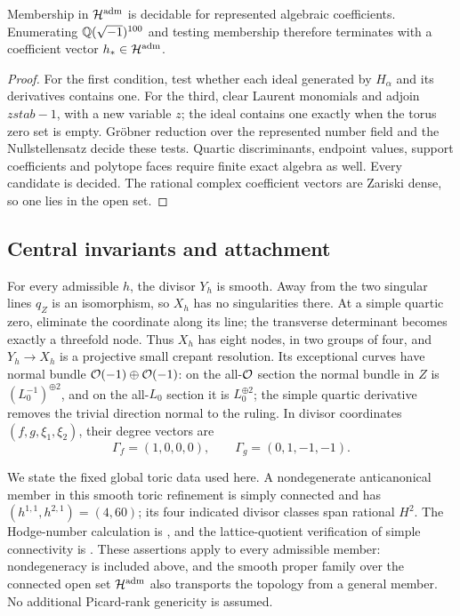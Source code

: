 \begin{proposition}\label{prop:algebraic-choice}
Membership in $\mathcal H^{\rm adm}$ is decidable for represented
algebraic coefficients. Enumerating $\mathbb Q(\sqrt{-1})^{100}$ and
testing membership therefore terminates with a coefficient vector
$h_*\in\mathcal H^{\rm adm}$.
\end{proposition}

\begin{proof}
For the first condition, test whether each ideal generated by
$H_\alpha$ and its derivatives contains one. For the third, clear
Laurent monomials and adjoin $zstab-1$, with a new variable $z$;
the ideal contains one exactly when the torus zero set is empty.
Gr\"obner reduction over the represented number field and the
Nullstellensatz decide these tests. Quartic discriminants, endpoint
values, support coefficients and polytope faces require finite exact
algebra as well. Every candidate is decided. The rational complex
coefficient vectors are Zariski dense, so one lies in the open set.
\end{proof}

\subsection{Central invariants and attachment}

For every admissible $h$, the divisor $Y_h$ is smooth. Away from
the two singular lines $q_Z$ is an isomorphism, so $X_h$ has
no singularities there. At a simple quartic zero, eliminate the
coordinate along its line; the transverse determinant becomes
exactly a threefold node. Thus $X_h$ has eight nodes, in two
groups of four, and $Y_h\to X_h$ is a projective small crepant
resolution. Its exceptional curves have normal bundle
$\mathcal O(-1)\oplus\mathcal O(-1)$: on the all-$\mathcal O$ section the normal
bundle in $Z$ is $(L_0^{-1})^{\oplus2}$, and on the all-$L_0$
section it is $L_0^{\oplus2}$; the simple quartic derivative
removes the trivial direction normal to the ruling. In divisor
coordinates $(f,g,\xi_1,\xi_2)$, their degree vectors are
\begin{equation}\label{eq:exceptional-types}
          \Gamma_f=(1,0,0,0),\qquad \Gamma_g=(0,1,-1,-1).
\end{equation}

We state the fixed global toric data used here. A nondegenerate
anticanonical member in this smooth toric refinement is simply
connected and has $(h^{1,1},h^{2,1})=(4,60)$; its four indicated
divisor classes span rational $H^2$. The Hodge-number calculation
is \cite[Appendix~A]{W_Toric}, and the lattice-quotient verification
of simple connectivity is \cite[Section~8]{W_HodgeRay}.
These assertions apply to every admissible member: nondegeneracy
is included above, and the smooth proper family over the connected
open set $\mathcal H^{\rm adm}$ also transports the topology from
a general member. No additional Picard-rank genericity is assumed.

